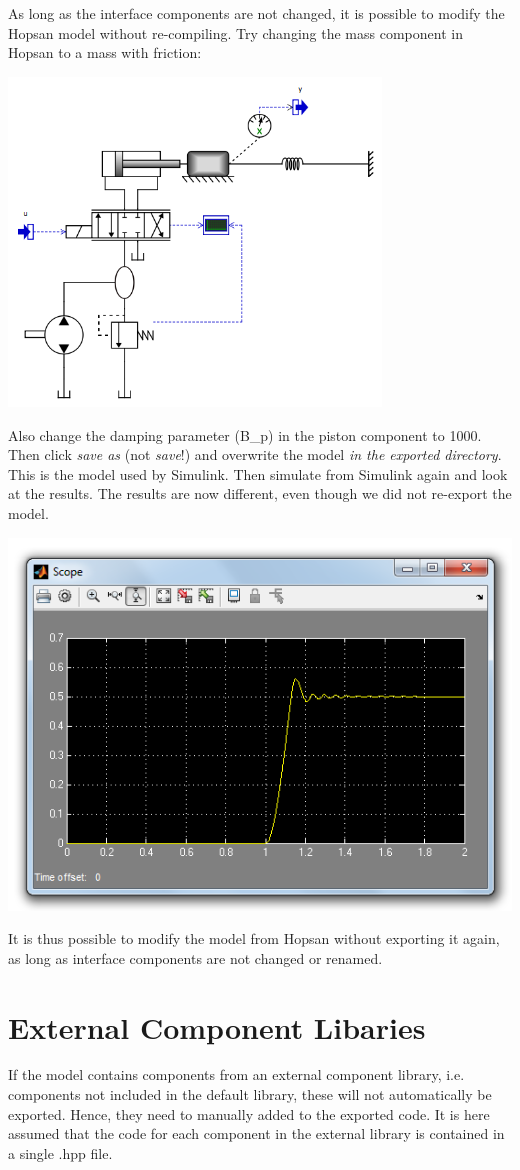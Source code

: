 \documentclass[a4paper]{article}
\begin{document}
\begin{enumerate}
As long as the interface components are not changed, it is possible to modify the Hopsan model without re-compiling.
Try changing the mass component in Hopsan to a mass with friction:

\includegraphics[height=8.73753cm]{gfx/simulink/modifiedmodel.png}

Also change the damping parameter (B\_p) in the piston component to 1000.
Then click \textit{save as} (not \textit{save}!) and overwrite the model \textit{in the exported directory}.
This is the model used by Simulink.
Then simulate from Simulink again and look at the results.
The results are now different, even though we did not re-export the model.

\includegraphics[width=0.6\linewidth]{gfx/simulink/simulinkplot2.png}

It is thus possible to modify the model from Hopsan without exporting it again, as long as interface components are not changed or renamed.

\end{enumerate}

\section*{External Component Libaries}
If the model contains components from an external component library, i.e. components not included in the default library, these will not automatically be exported. Hence, they need to manually added to the exported code. It is here assumed that the code for each component in the external library is contained in a single .hpp file.
\end{document}
